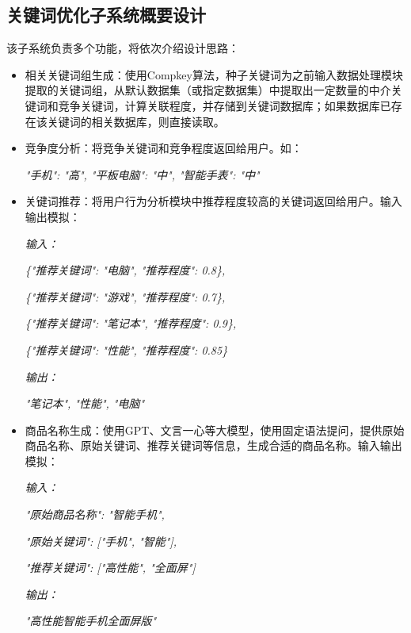 \documentclass[11pt, a4paper, oneside]{ctexbook}
\begin{document}
\subsection{关键词优化子系统概要设计}
该子系统负责多个功能，将依次介绍设计思路：
\begin{itemize}
    \item 相关关键词组生成：使用Compkey算法，种子关键词为之前输入数据处理模块提取的关键词组，从默认数据集（或指定数据集）中提取出一定数量的中介关键词和竞争关键词，计算关联程度，并存储到关键词数据库；如果数据库已存在该关键词的相关数据库，则直接读取。
    \item 竞争度分析：将竞争关键词和竞争程度返回给用户。如：

          \textit{"手机": "高", "平板电脑": "中", "智能手表": "中"}\vspace{-0.5em}
    \item 关键词推荐：将用户行为分析模块中推荐程度较高的关键词返回给用户。输入输出模拟：

          \textit{输入：}\vspace{-0.5em}

          \textit{\{"推荐关键词": "电脑", "推荐程度": 0.8\},}\vspace{-0.5em}

          \textit{\{"推荐关键词": "游戏", "推荐程度": 0.7\},}\vspace{-0.5em}

          \textit{\{"推荐关键词": "笔记本", "推荐程度": 0.9\},}\vspace{-0.5em}

          \textit{\{"推荐关键词": "性能", "推荐程度": 0.85\}}\vspace{-0.5em}

          \textit{输出：}\vspace{-0.5em}

          \textit{"笔记本", "性能", "电脑"}\vspace{-0.5em}
    \item 商品名称生成：使用GPT、文言一心等大模型，使用固定语法提问，提供原始商品名称、原始关键词、推荐关键词等信息，生成合适的商品名称。输入输出模拟：

          \textit{输入：}\vspace{-0.5em}

          \textit{"原始商品名称": "智能手机",}\vspace{-0.5em}

          \textit{"原始关键词": ["手机", "智能"],}\vspace{-0.5em}

          \textit{"推荐关键词": ["高性能", "全面屏"]}\vspace{-0.5em}

          \textit{输出：}\vspace{-0.5em}

          \textit{"高性能智能手机全面屏版"}\vspace{-0.5em}
\end{itemize}
\end{document}
